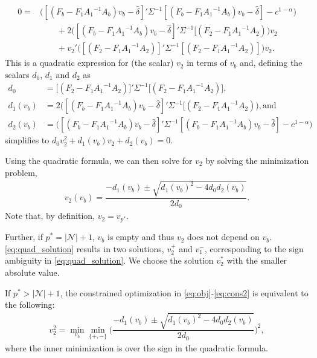 \documentclass[12pt]{article}
\begin{document}
\begin{align*}
0 = &\bigg([(F_b - F_1 {A_1}^{-1}A_b) v_b - \widehat{\delta}]' \Sigma ^ {-1} [(F_b - F_1 {A_1}^{-1}A_b) v_b - \widehat{\delta}] - c^{1 - \alpha} \bigg) \\
&\qquad + 2 \bigg([(F_b - F_1 {A_1}^{-1}A_b) v_b - \widehat{\delta}]' \Sigma ^ {-1} [(F_2 - F_1 {A_1}^{-1} A_2) \bigg) v_2 \nonumber \\
&\qquad +  v_2'\bigg([(F_2 - F_1 {A_1}^{-1} A_2)]'\Sigma ^ {-1} [(F_2 - F_1 {A_1}^{-1}A_2)] \bigg)v_2 .
\end{align*}
This is a quadratic expression for (the scalar) $v_2$ in terms of $v_b$ and, defining the scalars $d_0$, $d_1$ and $d_2$ as
\begin{align*}
d_0 &= \big[(F_2 - F_1 {A_1}^{-1} A_2)\big]'\Sigma ^ {-1} \big[(F_2 - F_1 {A_1}^{-1}A_2)\big], \\
d_1(v_b) &= 2 \bigg([(F_b - F_1 {A_1}^{-1}A_b) v_b - \widehat{\delta}]' \Sigma ^ {-1} [(F_2 - F_1 {A_1}^{-1} A_2) \bigg), \text{and} \\
d_2(v_b) &= \bigg([(F_b - F_1 {A_1}^{-1}A_b) v_b - \widehat{\delta}]' \Sigma ^ {-1} [(F_b - F_1 {A_1}^{-1}A_b) v_b - \widehat{\delta}] - c^{1 - \alpha} \bigg)
\end{align*}
simplifies to $d_0 v_2^2 +  d_1(v_b) v_2 + d_2 (v_b)=0$.

Using the quadratic formula, we can then solve for $v_2$ by solving the minimization problem,
\begin{align}
\label{eq:quad_solution}
    v_2(v_b) = \dfrac{-d_1(v_b) \pm \sqrt{d_1(v_b)^2 - 4 d_0 d_2(v_b)}}{2 d_0}.
\end{align}
Note that, by definition, $v_2 = v_{p^*}$.

Further, if $p^*= |\mathcal{N}|+1$, $v_b$ is empty and thus $v_2$ does not depend on $v_b$.
\eqref{eq:quad_solution} results in two solutions, $v_2^+$ and $v_1^-$, corresponding to the sign ambiguity in \eqref{eq:quad_solution}.
We choose the solution $v^*_2$ with the smaller absolute value.

If $p^*> |\mathcal{N}|+1$, the constrained optimization in \eqref{eq:obj}-\eqref{eq:cons2} is equivalent to the following:
\begin{align}
  v^2_2 =  \min_{v_b} \min_{\{+,-\}} \bigg( \dfrac{-d_1(v_b) \pm \sqrt{d_1(v_b)^2 - 4 d_0 d_2(v_b)}}{2 d_0} \bigg)^2,\label{eq:quad_solution_min}
\end{align}
where the inner minimization is over the sign in the quadratic formula.
\end{document}
